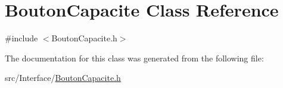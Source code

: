 \hypertarget{class_bouton_capacite}{}\section{Bouton\+Capacite Class Reference}
\label{class_bouton_capacite}


{\ttfamily \#include $<$Bouton\+Capacite.\+h$>$}



The documentation for this class was generated from the following file\+:\begin{DoxyCompactItemize}
\item 
src/\+Interface/\mbox{\hyperlink{_bouton_capacite_8h}{Bouton\+Capacite.\+h}}\end{DoxyCompactItemize}
